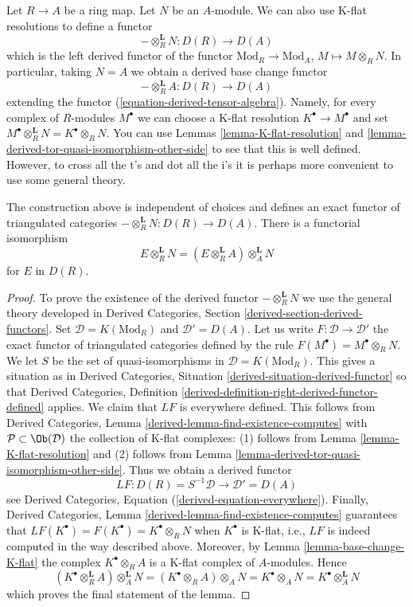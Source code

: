 \noindent
Let $R \to A$ be a ring map. Let $N$ be an $A$-module. We can also use K-flat
resolutions to define a functor
$$
- \otimes_R^{\mathbf{L}} N : D(R) \to D(A)
$$
which is the left derived functor of the functor
$\text{Mod}_R \to \text{Mod}_A$, $M \mapsto M \otimes_R N$.
In particular, taking $N = A$ we obtain a derived base change functor
$$
- \otimes_R^{\mathbf{L}} A : D(R) \to D(A)
$$
extending the functor (\ref{equation-derived-tensor-algebra}).
Namely, for every complex of $R$-modules $M^\bullet$ we can
choose a K-flat resolution $K^\bullet \to M^\bullet$ and set
$M^\bullet \otimes_R^{\mathbf{L}} N = K^\bullet \otimes_R N$.
You can use
Lemmas \ref{lemma-K-flat-resolution} and
\ref{lemma-derived-tor-quasi-isomorphism-other-side}
to see that this is well defined. However, to cross all the t's and dot all
the i's it is perhaps more convenient to use some general theory.

\begin{lemma}
\label{lemma-derived-base-change}
The construction above is independent of choices and defines an exact
functor of triangulated categories $- \otimes_R^\mathbf{L} N : D(R) \to D(A)$.
There is a functorial isomorphism
$$
E \otimes_R^\mathbf{L} N = (E \otimes_R^\mathbf{L} A) \otimes_A^\mathbf{L} N
$$
for $E$ in $D(R)$.
\end{lemma}

\begin{proof}
To prove the existence of the derived functor $- \otimes_R^\mathbf{L} N$
we use the general theory developed in
Derived Categories, Section \ref{derived-section-derived-functors}.
Set $\mathcal{D} = K(\text{Mod}_R)$ and $\mathcal{D}' = D(A)$.
Let us write $F : \mathcal{D} \to \mathcal{D}'$ the exact functor
of triangulated categories defined by the rule
$F(M^\bullet) = M^\bullet \otimes_R N$. We let $S$ be the set of
quasi-isomorphisms in $\mathcal{D} = K(\text{Mod}_R)$.
This gives a situation as in
Derived Categories, Situation \ref{derived-situation-derived-functor}
so that
Derived Categories, Definition
\ref{derived-definition-right-derived-functor-defined}
applies. We claim that $LF$ is everywhere defined.
This follows from
Derived Categories, Lemma \ref{derived-lemma-find-existence-computes}
with $\mathcal{P} \subset \Ob(\mathcal{D})$ the collection
of K-flat complexes: (1) follows from
Lemma \ref{lemma-K-flat-resolution}
and (2) follows from
Lemma \ref{lemma-derived-tor-quasi-isomorphism-other-side}.
Thus we obtain a derived functor
$$
LF : D(R) = S^{-1}\mathcal{D} \longrightarrow \mathcal{D}' = D(A)
$$
see
Derived Categories, Equation (\ref{derived-equation-everywhere}).
Finally,
Derived Categories, Lemma \ref{derived-lemma-find-existence-computes}
guarantees that $LF(K^\bullet) = F(K^\bullet) = K^\bullet \otimes_R N$
when $K^\bullet$ is K-flat, i.e., $LF$ is indeed computed in the way
described above. Moreover, by Lemma \ref{lemma-base-change-K-flat}
the complex $K^\bullet \otimes_R A$ is a K-flat complex of $A$-modules.
Hence
$$
(K^\bullet \otimes_R^\mathbf{L} A) \otimes_A^\mathbf{L} N =
(K^\bullet \otimes_R A) \otimes_A N =
K^\bullet \otimes_A N =
K^\bullet \otimes_A^\mathbf{L} N
$$
which proves the final statement of the lemma.
\end{proof}

